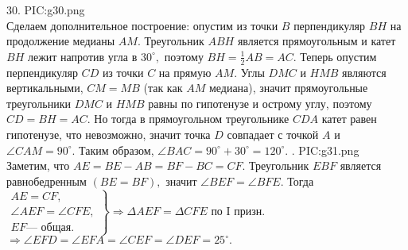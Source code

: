 30. {{PIC:g30.png}}\\
Сделаем дополнительное построение: опустим из точки $B$ перпендикуляр $BH$ на продолжение медианы $AM.$ Треугольник $ABH$ является прямоугольным и катет $BH$ лежит напротив угла в $30^\circ,$ поэтому $BH=\frac{1}{2}AB=AC.$ Теперь опустим перпендикуляр $CD$ из точки $C$ на прямую $AM.$ Углы $DMC$ и $HMB$ являются вертикальными, $CM=MB$ (так как $AM$ медиана), значит прямоугольные треугольники $DMC$ и $HMB$ равны по гипотенузе и острому углу, поэтому $CD=BH=AC.$ Но тогда в прямоугольном треугольнике $CDA$ катет равен гипотенузе, что невозможно, значит точка $D$ совпадает с точкой $A$ и $\angle CAM=90^\circ.$ Таким образом, $\angle BAC=90^\circ+30^\circ=120^\circ.$\newpage
{}. {{PIC:g31.png}}\\
Заметим, что $AE=BE-AB=BF-BC=CF.$ Треугольник $EBF$ является равнобедренным $(BE=BF),$ значит $\angle BEF=\angle BFE.$ Тогда
$\left.\begin{array}{l}AE=CF,\\
\angle AEF=\angle CFE,\\
EF\text{--- общая.}  \end{array}\right\}\Rightarrow \Delta AEF=\Delta CFE\text{ по I призн.}$\\$\Rightarrow \angle EFD=\angle EFA=\angle CEF=\angle DEF=25^\circ.$\\
